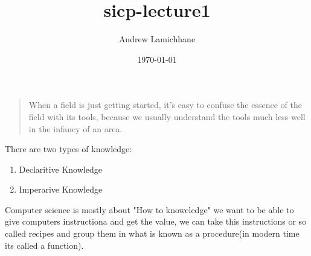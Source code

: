 \documentclass[11pt]{article}
\author{Andrew Lamichhane}
\date{\today}
\title{sicp-lecture1}
\begin{document}
\maketitle
\tableofcontents

\begin{quote}
When a field is just getting started, it’s easy to confuse the essence of the field with its tools,
because we usually understand the tools much less well in the infancy of an area.
\end{quote}

There are two types of knowledge:
\begin{enumerate}
\item Declaritive Knowledge
\item Imperarive Knowledge
\end{enumerate}

Computer science is mostly about "How to knoweledge" we want to be able to give computers instructiona and get the value, we can take this instructions or so called recipes and group them in what is known as a procedure(in modern time its called a function).
\end{document}
